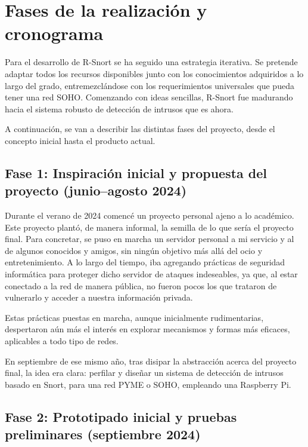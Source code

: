 \documentclass[11pt,a4paper,twoside]{report}
\begin{document}
\chapter{Fases de la realización y cronograma}

Para el desarrollo de R-Snort se ha seguido una estrategia iterativa. Se pretende adaptar todos los recursos disponibles junto con los conocimientos adquiridos a lo largo del grado, entremezclándose con los requerimientos universales que pueda tener una red SOHO. Comenzando con ideas sencillas, R-Snort fue madurando hacia el sistema robusto de detección de intrusos que es ahora.\newline

A continuación, se van a describir las distintas fases del proyecto, desde el concepto inicial hasta el producto actual.

\section{Fase 1: Inspiración inicial y propuesta del proyecto (junio–agosto 2024)}

Durante el verano de 2024 comencé un proyecto personal ajeno a lo académico. Este proyecto plantó, de manera informal, la semilla de lo que sería el proyecto final. Para concretar, se puso en marcha un servidor personal a mi servicio y al de algunos conocidos y amigos, sin ningún objetivo más allá del ocio y entretenimiento. A lo largo del tiempo, iba agregando prácticas de seguridad informática para proteger dicho servidor de ataques indeseables, ya que, al estar conectado a la red de manera pública, no fueron pocos los que trataron de vulnerarlo y acceder a nuestra información privada.\newline

Estas prácticas puestas en marcha, aunque inicialmente rudimentarias, despertaron aún más el interés en explorar mecanismos y formas más eficaces, aplicables a todo tipo de redes.\newline

En septiembre de ese mismo año, tras disipar la abstracción acerca del proyecto final, la idea era clara: perfilar y diseñar un sistema de detección de intrusos basado en Snort, para una red PYME o SOHO, empleando una Raspberry Pi.

\section{Fase 2: Prototipado inicial y pruebas preliminares (septiembre 2024)}
\end{document}
